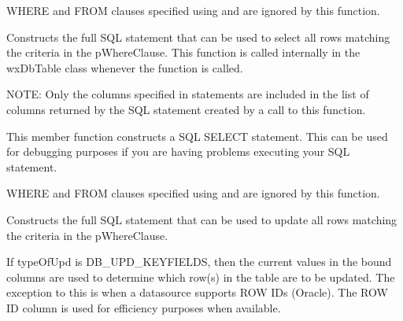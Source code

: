 WHERE and FROM clauses specified using  
and  are ignored by 
this function.


\label{wxdbtablebuildselectstmt}


Constructs the full SQL statement that can be used to select all rows matching
the criteria in the pWhereClause.  This function is called internally in the 
wxDbTable class whenever the function  
is called.

NOTE: Only the columns specified in  
statements are included in the list of columns returned by the SQL statement 
created by a call to this function.




This member function constructs a SQL SELECT statement.  This can be used for 
debugging purposes if you are having problems executing your SQL statement.

WHERE and FROM clauses specified using 
and  are ignored by 
this function.


\label{wxdbtablebuildupdatestmt}


Constructs the full SQL statement that can be used to update all rows matching
the criteria in the pWhereClause.

If typeOfUpd is DB_UPD_KEYFIELDS, then the current values in the bound columns
are used to determine which row(s) in the table are to be updated. The 
exception to this is when a datasource supports ROW IDs (Oracle).  The ROW ID
column is used for efficiency purposes when available.

